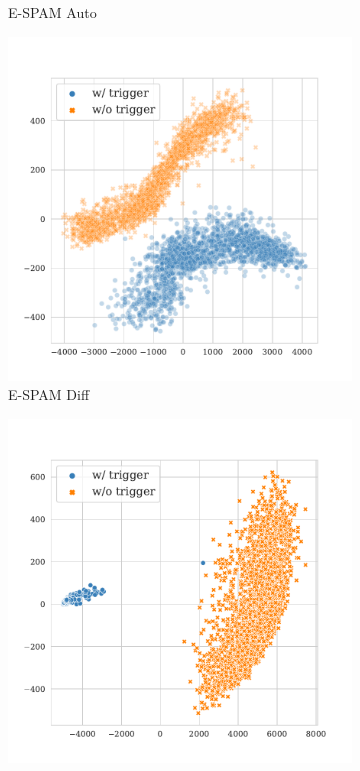 \begin{figure}[!ht]
\begin{subfigure}{.16\textwidth}
  \caption{\tiny{E-SPAM Auto}}
  \label{fig:enron_spam_auto_k16_embed_extra}
\end{subfigure}%
\begin{subfigure}{.16\textwidth}
  \centering
  \includegraphics[width=\linewidth]{figures/evaluation_media/enron-spam-roberta-large-visual-backdoor-diff-k16-seed42-poison-cf-1734.pdf}
  \caption{\tiny{E-SPAM Diff}}
  \label{fig:enron_spam_diff_k16_embed_extra}
\end{subfigure}%
\begin{subfigure}{.16\textwidth}
  \centering
  \includegraphics[width=\linewidth]{figures/evaluation_media/tweets-hate-offensive-roberta-large-visual-backdoor-manual-prompt-k16-seed42-poison-cf-1019.pdf}

\end{subfigure}
\end{figure}
